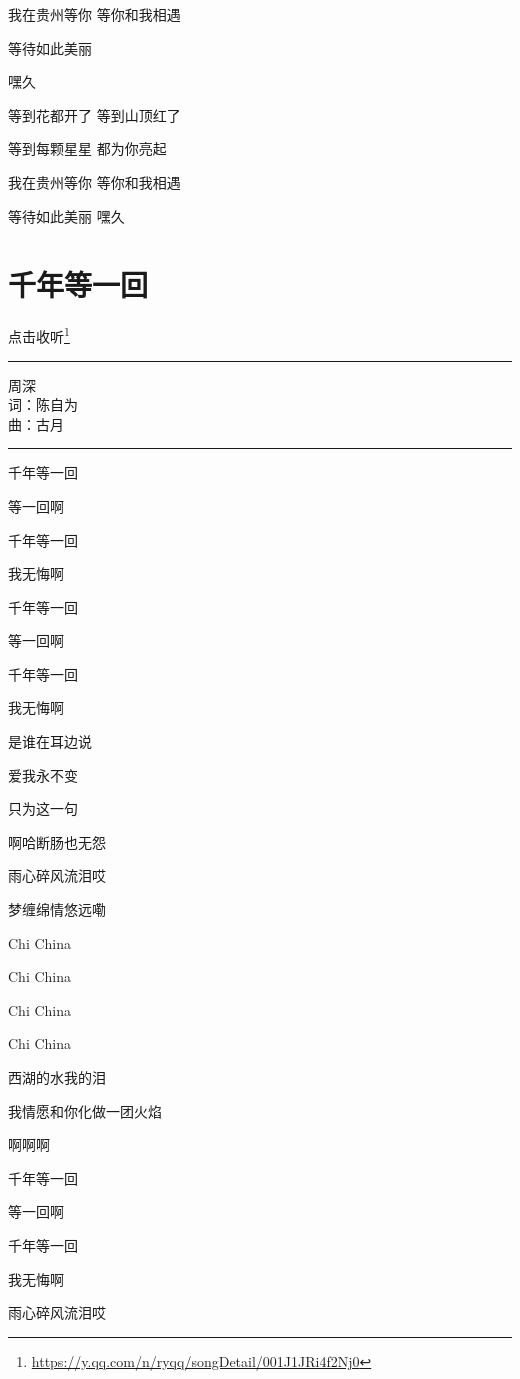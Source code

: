 \documentclass[]{ctexbook}
\renewcommand{\href}[2]{#2\footnote{\url{#1}}}
\begin{document}
我在贵州等你 等你和我相遇

等待如此美丽

嘿久

等到花都开了 等到山顶红了

等到每颗星星 都为你亮起

我在贵州等你 等你和我相遇

等待如此美丽 嘿久

\section*{千年等一回}\label{once-in-1000}


\href{https://y.qq.com/n/ryqq/songDetail/001J1JRi4f2Nj0}{点击收听}

\begin{center}\rule{0.5\linewidth}{0.5pt}\end{center}

周深\\
词：陈自为\\
曲：古月

\begin{center}\rule{0.5\linewidth}{0.5pt}\end{center}

千年等一回

等一回啊

千年等一回

我无悔啊

千年等一回

等一回啊

千年等一回

我无悔啊

是谁在耳边说

爱我永不变

只为这一句

啊哈断肠也无怨

雨心碎风流泪哎

梦缠绵情悠远嘞

Chi China

Chi China

Chi China

Chi China

西湖的水我的泪

我情愿和你化做一团火焰

啊啊啊

千年等一回

等一回啊

千年等一回

我无悔啊

雨心碎风流泪哎
\end{document}
